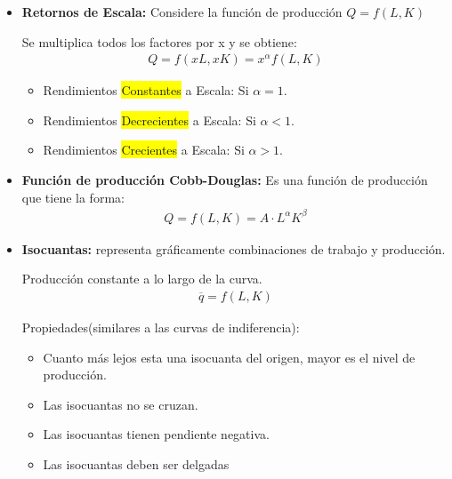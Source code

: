 \documentclass{templateNote}
\newcommand{\destacar}[1]{ \colorbox{yellow}{#1}}
\begin{document}
\begin{itemize}
    \item \textbf{Retornos de Escala:}
    Considere la función de producción $Q = f(L, K)$

    Se multiplica todos los factores por x y se obtiene:
    \begin{align*}
        Q = f(xL, xK) = x^{\alpha}f(L, K)
    \end{align*}
    \begin{itemize}
        \item Rendimientos \destacar{Constantes} a Escala: Si $\alpha = 1$.
        
        \item Rendimientos \destacar{Decrecientes} a Escala: Si $\alpha < 1$.
        
        \item Rendimientos \destacar{Crecientes} a Escala: Si $\alpha > 1$.
    \end{itemize}

    \item \textbf{Función de producción Cobb-Douglas:} Es una función de producción que tiene la forma:
    \begin{align*}
        Q = f(L,K) = A \cdot L^{\alpha}K^{\beta}
    \end{align*}

    \item \textbf{Isocuantas:} representa gráficamente combinaciones de trabajo y producción.
    
    Producción constante a lo largo de la curva.
    \begin{align*}
        \overline{q} = f(L,K)
    \end{align*}

    Propiedades(similares a las curvas de indiferencia):
    \begin{itemize}
        \item Cuanto más lejos esta una isocuanta del origen, mayor es el nivel de producción.
        \item Las isocuantas no se cruzan.
        \item Las isocuantas tienen pendiente negativa.
        \item Las isocuantas deben ser delgadas
    \end{itemize}


\end{itemize}
\end{document}
